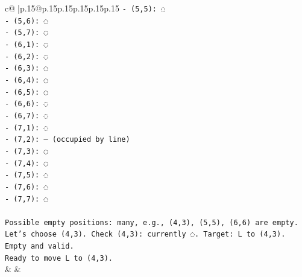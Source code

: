 \documentclass{article}
\begin{document}
{\begin{supertabular}{c@{$\;$}|p{.15\linewidth}@{}p{.15\linewidth}p{.15\linewidth}p{.15\linewidth}p{.15\linewidth}p{.15\linewidth}}
{{{\texttt{{-} (5,5): ◌} \\
\texttt{{-} (5,6): ◌} \\
\texttt{{-} (5,7): ◌} \\
\texttt{{-} (6,1): ◌} \\
\texttt{{-} (6,2): ◌} \\
\texttt{{-} (6,3): ◌} \\
\texttt{{-} (6,4): ◌} \\
\texttt{{-} (6,5): ◌} \\
\texttt{{-} (6,6): ◌} \\
\texttt{{-} (6,7): ◌} \\
\texttt{{-} (7,1): ◌} \\
\texttt{{-} (7,2): ─ (occupied by line)} \\
\texttt{{-} (7,3): ◌} \\
\texttt{{-} (7,4): ◌} \\
\texttt{{-} (7,5): ◌} \\
\texttt{{-} (7,6): ◌} \\
\texttt{{-} (7,7): ◌} \\
\\ 
\texttt{Possible empty positions: many, e.g., (4,3), (5,5), (6,6) are empty. Let's choose (4,3). Check (4,3): currently ◌. Target: L to (4,3). Empty and valid.} \\
\texttt{Ready to move L to (4,3).} \\
            }
        }
    }
    & & \\ \\


\end{supertabular}}
\end{document}
